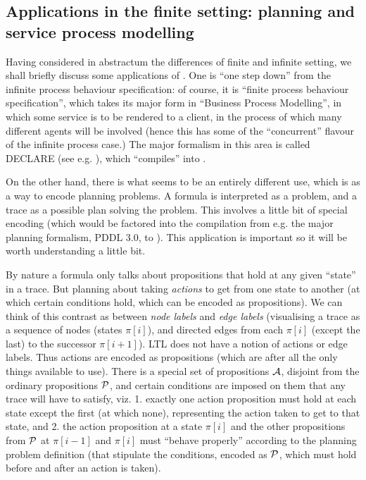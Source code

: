 \begin{center}
\subsection{Applications in the finite setting: planning and service process modelling}

Having considered in abstractum the differences of finite and infinite setting, we shall briefly discuss some applications of \ltlf.
One is ``one step down'' from the infinite process behaviour specification: of course, it is ``finite process behaviour specification'', which takes its major form in
``Business Process Modelling'', in which some service is to be rendered to a client, in the process of which many different agents will be involved
(hence this has some of the ``concurrent'' flavour of the infinite process case.)
The major formalism in this area is called DECLARE (see e.g. \cite{decserflow}), which ``compiles'' into \ltlf.

On the other hand, there is what seems to be an entirely different use, which is as a way to encode planning problems.
A formula is interpreted as a problem, and a trace as a possible plan solving the problem.
This involves a little bit of special encoding (which would be factored into the compilation from e.g. the major planning formalism,
PDDL 3.0, to \ltlf). This application is important so it will be worth understanding a little bit.

By nature a formula only talks about propositions that hold at any given ``state'' in a trace.
But planning about taking \emph{actions} to get from one state to another (at which certain conditions hold, which can be encoded as propositions).
We can think of this contrast as between \emph{node labels} and \emph{edge labels}
(visualising a trace as a sequence of nodes (states $\pi[i]$), and directed edges from each $\pi[i]$ (except the last) to the successor $\pi[i+1]$).
LTL does not have a notion of actions or edge labels.
Thus actions are encoded as propositions (which are after all the only things available to use).
There is a special set of propositions $\mathcal{A}$, disjoint from the ordinary propositions $\mathcal{P}$,
and certain conditions are imposed on them that any trace will have to satisfy, viz.
1. exactly one action proposition must hold at each state except the first (at which none),
representing the action taken to get to that state,
and 2. the action proposition at a state $\pi[i]$
and the other propositions from $\mathcal{P}$ at $\pi[i-1]$ and $\pi[i]$ must
``behave properly'' according to the planning problem definition (that stipulate the conditions, encoded as $\mathcal{P}$, which must hold before and after an action is taken).


\end{center}
